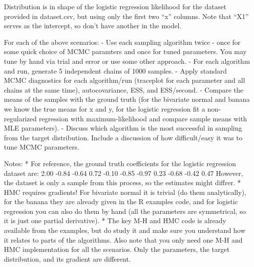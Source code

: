 \documentclass[
]{article}
\begin{document}
Distribution is in shape of the logistic regression likelihood for the
dataset provided in dataset.csv, but using only the first two ``x''
columns. Note that ``X1'' serves as the intercept, so don't have another
in the model.

For each of the above scenarios: - Use each sampling algorithm twice -
once for some quick choice of MCMC paramters and once for tuned
parameters. You may tune by hand via trial and error or use some other
approach. - For each algorithm and run, generate 5 independent chains of
1000 samples. - Apply standard MCMC diagnostics for each algorithm/run
(traceplot for each parameter and all chains at the same time),
autocovariance, ESS, and ESS/second. - Compare the means of the samples
with the ground truth (for the bivariate normal and banana we know the
true means for x and y, for the logistic regression fit a
non-regularized regression with maximum-likelihood and compare sample
means with MLE parameters). - Discuss which algorithm is the most
successful in sampling from the target distribution. Include a
discussion of how difficult/easy it was to tune MCMC parameters.

Notes: * For reference, the ground truth coefficients for the logistic
regression dataset are: 2.00 -0.84 -0.64 0.72 -0.10 -0.85 -0.97 0.23
-0.68 -0.42 0.47 However, the dataset is only a sample from this
process, so the estimates might diffrer. * HMC requires gradients! For
bivariate normal it is trivial (do them analytically), for the banana
they are already given in the R examples code, and for logistic
regression you can also do them by hand (all the parameters are
symmetrical, so it is just one partial derivative). * The key M-H and
HMC code is already available from the examples, but do study it and
make sure you understand how it relates to parts of the algorithms. Also
note that you only need one M-H and HMC implementation for all the
scenarios. Only the parameters, the target distribution, and its
gradient are different.
\end{document}
